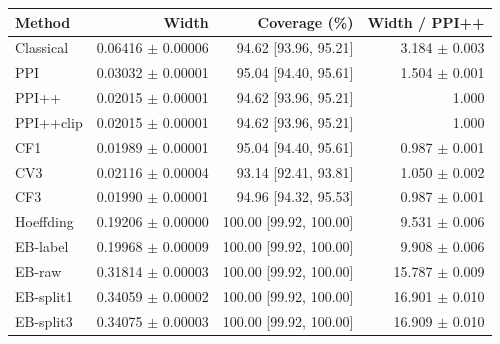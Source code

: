 \small
\begin{tabular}{lrrr}
\toprule
Method & Width & Coverage (\%) & Width / PPI++ \\
\midrule
Classical & 0.06416 $\pm$ 0.00006 & 94.62 [93.96, 95.21] & 3.184 $\pm$ 0.003 \\
PPI & 0.03032 $\pm$ 0.00001 & 95.04 [94.40, 95.61] & 1.504 $\pm$ 0.001 \\
PPI++ & 0.02015 $\pm$ 0.00001 & 94.62 [93.96, 95.21] & 1.000 \\
PPI++clip & 0.02015 $\pm$ 0.00001 & 94.62 [93.96, 95.21] & 1.000 \\
CF1 & 0.01989 $\pm$ 0.00001 & 95.04 [94.40, 95.61] & 0.987 $\pm$ 0.001 \\
CV3 & 0.02116 $\pm$ 0.00004 & 93.14 [92.41, 93.81] & 1.050 $\pm$ 0.002 \\
CF3 & 0.01990 $\pm$ 0.00001 & 94.96 [94.32, 95.53] & 0.987 $\pm$ 0.001 \\
Hoeffding & 0.19206 $\pm$ 0.00000 & 100.00 [99.92, 100.00] & 9.531 $\pm$ 0.006 \\
EB-label & 0.19968 $\pm$ 0.00009 & 100.00 [99.92, 100.00] & 9.908 $\pm$ 0.006 \\
EB-raw & 0.31814 $\pm$ 0.00003 & 100.00 [99.92, 100.00] & 15.787 $\pm$ 0.009 \\
EB-split1 & 0.34059 $\pm$ 0.00002 & 100.00 [99.92, 100.00] & 16.901 $\pm$ 0.010 \\
EB-split3 & 0.34075 $\pm$ 0.00003 & 100.00 [99.92, 100.00] & 16.909 $\pm$ 0.010 \\
\bottomrule
\end{tabular}
